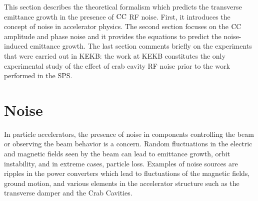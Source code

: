 \thispagestyle{simple} %
This section describes the theoretical formalism which predicts the transverse emittance growth in the presence of ${\mathrm{CC}}$ RF noise. First, it introduces the concept of noise in accelerator physics. The second section focuses on the ${\mathrm{CC}}$ amplitude and phase noise and it provides the equations to predict the noise-induced emittance growth. The last section comments briefly on the experiments that were carried out in KEKB: the work at KEKB constitutes the only experimental study of the effect of crab cavity RF noise prior to the work performed in the SPS. 



\section{Noise}\label{sec:noise_definition}
In particle accelerators, the presence of noise in components controlling the beam or observing the beam behavior is a concern. Random fluctuations in the electric and magnetic fields seen by the beam can lead to emittance growth, orbit instability, and in extreme cases, particle loss. Examples of noise sources are ripples in the power converters which lead to fluctuations of the magnetic fields, ground motion, and various elements in the accelerator structure such as the transverse damper and the Crab Cavities. %

